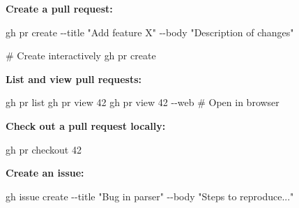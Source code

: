 \documentclass[
  letterpaper,
  DIV=11,
  numbers=noendperiod]{scrreprt}
\newenvironment{Shaded}{\begin{snugshade}}{\end{snugshade}}
\newcommand{\AttributeTok}[1]{\textcolor[rgb]{0.40,0.45,0.13}{#1}}
\newcommand{\CommentTok}[1]{\textcolor[rgb]{0.37,0.37,0.37}{#1}}
\newcommand{\ExtensionTok}[1]{\textcolor[rgb]{0.00,0.23,0.31}{#1}}
\newcommand{\NormalTok}[1]{\textcolor[rgb]{0.00,0.23,0.31}{#1}}
\newcommand{\StringTok}[1]{\textcolor[rgb]{0.13,0.47,0.30}{#1}}
\begin{document}
\textbf{Create a pull request:}

\begin{codelisting}

\caption{\texttt{terminal}}

\begin{Shaded}
\begin{Highlighting}[]
\ExtensionTok{gh}\NormalTok{ pr create }\AttributeTok{{-}{-}title} \StringTok{"Add feature X"} \AttributeTok{{-}{-}body} \StringTok{"Description of changes"}

\CommentTok{\# Create interactively}
\ExtensionTok{gh}\NormalTok{ pr create}
\end{Highlighting}
\end{Shaded}

\end{codelisting}

\textbf{List and view pull requests:}

\begin{codelisting}

\caption{\texttt{terminal}}

\begin{Shaded}
\begin{Highlighting}[]
\ExtensionTok{gh}\NormalTok{ pr list}
\ExtensionTok{gh}\NormalTok{ pr view 42}
\ExtensionTok{gh}\NormalTok{ pr view 42 }\AttributeTok{{-}{-}web}  \CommentTok{\# Open in browser}
\end{Highlighting}
\end{Shaded}

\end{codelisting}

\textbf{Check out a pull request locally:}

\begin{codelisting}

\caption{\texttt{terminal}}

\begin{Shaded}
\begin{Highlighting}[]
\ExtensionTok{gh}\NormalTok{ pr checkout 42}
\end{Highlighting}
\end{Shaded}

\end{codelisting}

\textbf{Create an issue:}

\begin{codelisting}

\caption{\texttt{terminal}}

\begin{Shaded}
\begin{Highlighting}[]
\ExtensionTok{gh}\NormalTok{ issue create }\AttributeTok{{-}{-}title} \StringTok{"Bug in parser"} \AttributeTok{{-}{-}body} \StringTok{"Steps to reproduce..."}
\end{Highlighting}
\end{Shaded}

\end{codelisting}
\end{document}
